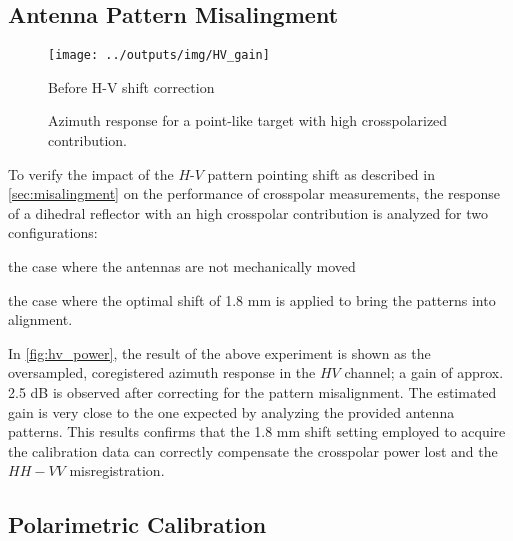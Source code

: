 \subsection{Antenna Pattern Misalingment}
\begin{figure}[ht!]
	\centering
	\texttt{[image: ../outputs/img/HV\_gain]}
	\caption{Before H-V shift correction}
	\label{fig:hv_power:uncalibrated}
	\caption{Azimuth response for a point-like target with high crosspolarized contribution.}
	\label{fig:hv_power}
\end{figure}
To verify the impact of the $H$-$V$ pattern pointing shift as described in \autoref{sec:misalingment} on the performance of crosspolar measurements, the response of a dihedral reflector with an high crosspolar contribution is analyzed for two configurations:\\ \begin{enumerate*}\item the case where the antennas are not mechanically moved \item the case where the optimal shift of 1.8 mm is applied to bring the patterns into alignment.\\ 
\end{enumerate*}
In \autoref{fig:hv_power}, the result of the above experiment is shown as the oversampled, coregistered azimuth response in the $HV$ channel; a gain of approx. 2.5 dB is observed after correcting for the pattern misalignment. The estimated gain is very close to the one expected by analyzing the provided antenna patterns. This results confirms that the 1.8 mm shift setting employed to acquire the calibration data can correctly compensate the crosspolar power lost and the $HH-VV$ misregistration.

\subsection{Polarimetric Calibration}\label{sec:res_polcal}

